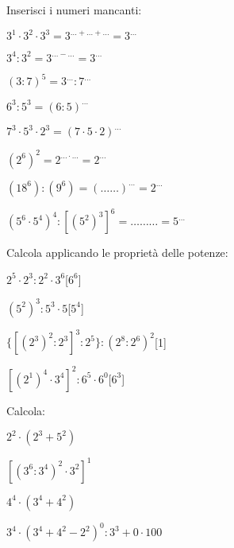 \begin{esercizio}
Inserisci i numeri mancanti:
 \begin{multicols}{2}
 \begin{enumeratea}
 \item \(3^1\cdot3^2\cdot3^3=3^{\ldots+\ldots+\ldots}=3^{\ldots}\)
 \item \(3^4:3^2=3^{\ldots-\ldots}=3^{\ldots}\)
 \item \((3:7)^5=3^{\ldots}:7^{\ldots}\)
 \item \(6^3:5^3=(6:5)^{\ldots}\)
 \item \(7^3\cdot5^3\cdot2^3=(7\cdot 5 \cdot 2)^{\ldots}\)
 \item \((2^6)^2=2^{\ldots\cdot\ldots}=2^{\ldots}\)
 \item \((18^6):(9^6)=(\ldots\ldots)^{\ldots}=2^{\ldots}\)
 \item \((5^6\cdot5^4)^4:[(5^2)^3]^6=\ldots\ldots\ldots=5^{\ldots}\)
 \end{enumeratea}

 \end{multicols}
\end{esercizio}

% 
\begin{esercizio}[\Ast]
Calcola applicando le proprietà delle potenze:
 \begin{multicols}{2}
 \begin{enumeratea}
 \item \(2^5\cdot2^3:2^2\cdot3^6\)\hfill[\(6^6\)]
 \item \((5^2)^3:5^3\cdot5\)\hfill[\(5^4\)]
 \item \(\{[(2^3)^2:2^3]^3:2^5\}:(2^8:2^6)^2\)\hfill[1]
 \item \([(2^1)^4\cdot 3^4]^2:6^5\cdot6^0\)\hfill[\(6^3\)]
 \end{enumeratea}
 \end{multicols}
\end{esercizio}

\newpage %

\begin{esercizio}
Calcola:
 \begin{multicols}{2}
 \begin{enumeratea}
 \item \(2^2\cdot(2^3+5^2)\)
 \item \([(3^6:3^4)^2\cdot3^2]^1\)
 \item \(4^4\cdot(3^4+4^2)\)
 \item \(3^4\cdot(3^4+4^2-2^2)^0:3^3+0\cdot100\)
 \end{enumeratea}
 \end{multicols}
\end{esercizio}

